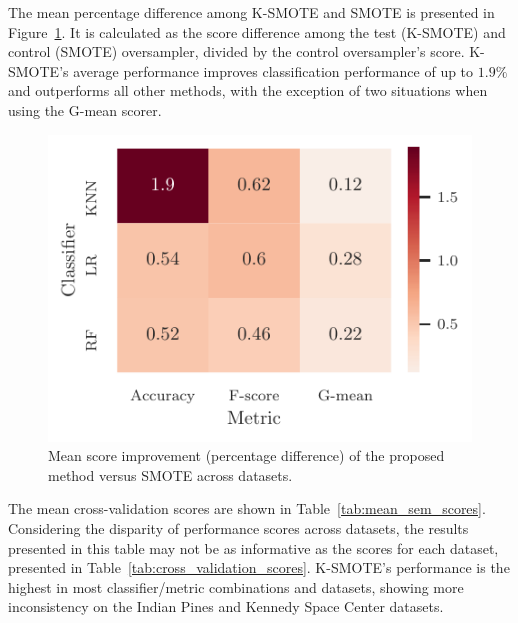 \documentclass[parskip=full]{scrartcl}
\begin{document}

The mean percentage difference among K-SMOTE and SMOTE is presented in
Figure~\ref{fig:mean_score_improvement_heatmap}. It is calculated as the score difference among the
test (K-SMOTE) and control (SMOTE) oversampler, divided by the control oversampler's score.
K-SMOTE's average performance improves classification performance of up to $1.9\%$ and outperforms
all other methods, with the exception of two situations when using the G-mean scorer.

\begin{figure}[H]
	\centering
	\includegraphics[height=.4\linewidth]{../analysis/mean_score_improvement_heatmap}
    \caption{Mean score improvement (percentage difference) of the proposed method versus
        SMOTE across datasets.
        }\label{fig:mean_score_improvement_heatmap}
\end{figure}

The mean cross-validation scores are shown in Table~\ref{tab:mean_sem_scores}. Considering the
disparity of performance scores across datasets, the results presented in this table may not be as
informative as the scores for each dataset, presented in Table~\ref{tab:cross_validation_scores}.
K-SMOTE's performance is the highest in most classifier/metric combinations and datasets, showing
more inconsistency on the Indian Pines and Kennedy Space Center datasets.

\end{document}
